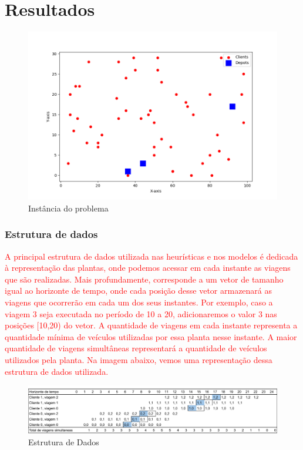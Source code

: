 \chapter{Resultados}


\begin{figure}[H]
    \centering
    \includegraphics[width=\linewidth]{img/inst_1.png}
    \caption{Instância do problema}
    \label{fig:inst1}
  \end{figure}
  
  \subsection*{Estrutura de dados}
  \label{subsec:estruturadosdados}
  \textcolor{red}{A principal estrutura de dados utilizada nas heurísticas e nos modelos é dedicada à representação das plantas, onde podemos acessar em cada instante as viagens que são realizadas. Mais profundamente, corresponde a um vetor de tamanho igual ao horizonte de tempo, onde cada posição desse vetor armazenará as viagens que ocorrerão em cada um dos seus instantes. Por exemplo, caso a viagem 3 seja executada no período de 10 a 20, adicionaremos o valor 3 nas posições [10,20) do vetor. A quantidade de viagens em cada instante representa a quantidade mínima de veículos utilizadas por essa planta nesse instante. A maior quantidade de viagens simultâneas representará a quantidade de veículos utilizados pela planta. 
  Na imagem abaixo, vemos uma representação dessa estrutura de dados utilizada.}
  
  \begin{figure}[H] %
    \centering
    \includegraphics[width=1\textwidth]{img/estrutura de dados.pdf}
    \caption{Estrutura de Dados}
  \end{figure}
  
